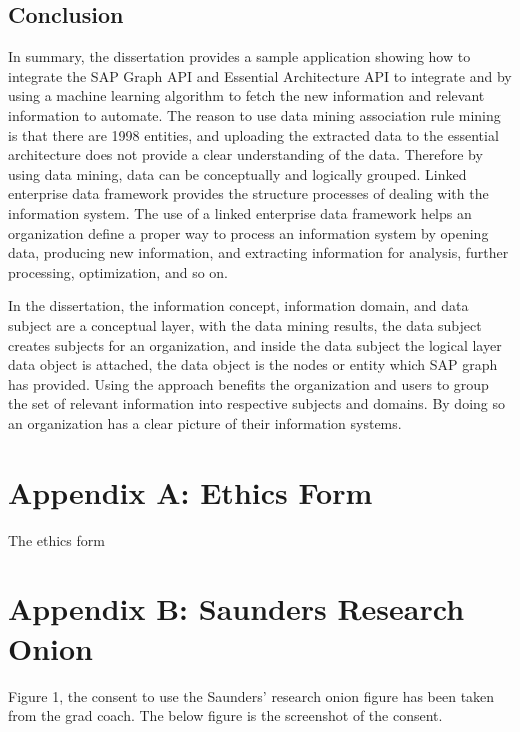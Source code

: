 \documentclass{article}
\begin{document}
\subsection{Conclusion}

In summary, the dissertation provides a sample application showing how to integrate the SAP Graph API and Essential Architecture API to integrate and by using a machine learning algorithm to fetch the new information and relevant information to automate. The reason to use data mining association rule mining is that there are 1998 entities, and uploading the extracted data to the essential architecture does not provide a clear understanding of the data. Therefore by using data mining, data can be conceptually and logically grouped. Linked enterprise data framework provides the structure processes of dealing with the information system. The use of a linked enterprise data framework helps an organization define a proper way to process an information system by opening data, producing new information, and extracting information for analysis, further processing, optimization, and so on. \parencite{galkin2016}

In the dissertation, the information concept, information domain, and data subject are a conceptual layer, with the data mining results, the data subject creates subjects for an organization, and inside the data subject the logical layer data object is attached, the data object is the nodes or entity which SAP graph has provided. Using the approach benefits the organization and users to group the set of relevant information into respective subjects and domains. By doing so an organization has a clear picture of their information systems.

\newpage
\printbibliography

\newpage
\appendix

\section{Appendix A: Ethics Form}

The ethics form

\section{Appendix B: Saunders Research Onion}
Figure 1, the consent to use the Saunders' research onion figure has been taken from the grad coach. The below figure is the screenshot of the consent.
\end{document}
